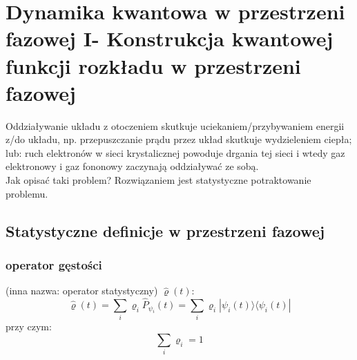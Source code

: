 \section{Dynamika kwantowa w przestrzeni fazowej I- Konstrukcja kwantowej funkcji rozkładu w przestrzeni fazowej}
Oddziaływanie układu z otoczeniem skutkuje uciekaniem/przybywaniem energii z/do układu, np. przepuszczanie prądu przez układ skutkuje wydzieleniem ciepła; lub: ruch elektronów w sieci krystalicznej powoduje drgania tej sieci i wtedy gaz elektronowy i gaz fononowy zaczynają oddziaływać ze sobą.\\
Jak opisać taki problem? Rozwiązaniem jest statystyczne potraktowanie problemu.
\subsection{Statystyczne definicje w przestrzeni fazowej}
\subsubsection{operator gęstości} (inna nazwa: operator statystyczny) $\hat{\varrho}(t)$:
\begin{equation}\hat{\varrho}(t)=\sum_i \varrho_i \hat{P}_{\psi_i}(t)=
\sum_i \varrho_i|\psi_i(t)\rangle\langle\psi_i(t)|\end{equation}
przy czym:
\begin{equation}\sum_i\varrho_i=1\end{equation}
